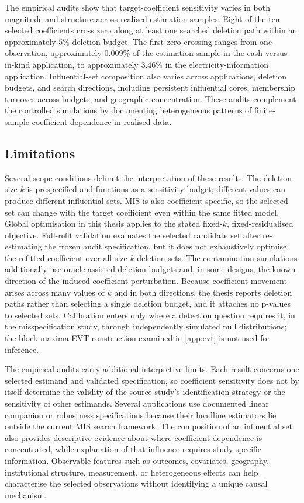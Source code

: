 \documentclass[../main.tex]{subfiles}
\begin{document}
The empirical audits show that target-coefficient sensitivity varies in both magnitude and structure across realised estimation samples. Eight of the ten selected coefficients cross zero along at least one searched deletion path within an approximately \(5\%\) deletion budget. The first zero crossing ranges from one observation, approximately \(0.009\%\) of the estimation sample in the cash-versus-in-kind application, to approximately \(3.46\%\) in the electricity-information application. Influential-set composition also varies across applications, deletion budgets, and search directions, including persistent influential cores, membership turnover across budgets, and geographic concentration. These audits complement the controlled simulations by documenting heterogeneous patterns of finite-sample coefficient dependence in realised data.

\subsection{Limitations}

Several scope conditions delimit the interpretation of these results. The deletion size \(k\) is prespecified and functions as a sensitivity budget; different values can produce different influential sets. MIS is also coefficient-specific, so the selected set can change with the target coefficient even within the same fitted model. Global optimisation in this thesis applies to the stated fixed-\(k\), fixed-residualised objective. Full-refit validation evaluates the selected candidate set after re-estimating the frozen audit specification, but it does not exhaustively optimise the refitted coefficient over all size-\(k\) deletion sets. The contamination simulations additionally use oracle-assisted deletion budgets and, in some designs, the known direction of the induced coefficient perturbation. Because coefficient movement arises across many values of $k$ and in both directions, the thesis reports deletion paths rather than selecting a single deletion budget, and it attaches no p-values to selected sets. Calibration enters only where a detection question requires it, in the misspecification study, through independently simulated null distributions; the block-maxima EVT construction examined in \autoref{app:evt} is not used for inference.

The empirical audits carry additional interpretive limits. Each result concerns one selected estimand and validated specification, so coefficient sensitivity does not by itself determine the validity of the source study's identification strategy or the sensitivity of other estimands. Several applications use documented linear companion or robustness specifications because their headline estimators lie outside the current MIS search framework. The composition of an influential set also provides descriptive evidence about where coefficient dependence is concentrated, while explanation of that influence requires study-specific information. Observable features such as outcomes, covariates, geography, institutional structure, measurement, or heterogeneous effects can help characterise the selected observations without identifying a unique causal mechanism.
\end{document}
